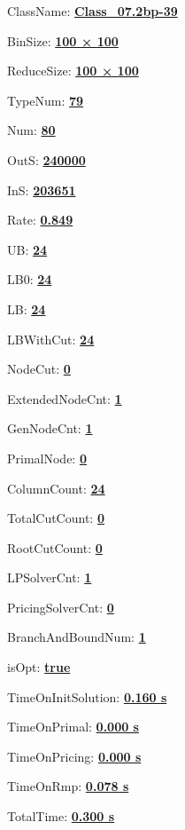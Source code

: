 \documentclass[11pt]{article}
\begin{document}
\pagestyle{empty}


ClassName: \underline{\textbf{Class_07.2bp-39}}
\par
BinSize: \underline{\textbf{100 × 100}}
\par
ReduceSize: \underline{\textbf{100 × 100}}
\par
TypeNum: \underline{\textbf{79}}
\par
Num: \underline{\textbf{80}}
\par
OutS: \underline{\textbf{240000}}
\par
InS: \underline{\textbf{203651}}
\par
Rate: \underline{\textbf{0.849}}
\par
UB: \underline{\textbf{24}}
\par
LB0: \underline{\textbf{24}}
\par
LB: \underline{\textbf{24}}
\par
LBWithCut: \underline{\textbf{24}}
\par
NodeCut: \underline{\textbf{0}}
\par
ExtendedNodeCnt: \underline{\textbf{1}}
\par
GenNodeCnt: \underline{\textbf{1}}
\par
PrimalNode: \underline{\textbf{0}}
\par
ColumnCount: \underline{\textbf{24}}
\par
TotalCutCount: \underline{\textbf{0}}
\par
RootCutCount: \underline{\textbf{0}}
\par
LPSolverCnt: \underline{\textbf{1}}
\par
PricingSolverCnt: \underline{\textbf{0}}
\par
BranchAndBoundNum: \underline{\textbf{1}}
\par
isOpt: \underline{\textbf{true}}
\par
TimeOnInitSolution: \underline{\textbf{0.160 s}}
\par
TimeOnPrimal: \underline{\textbf{0.000 s}}
\par
TimeOnPricing: \underline{\textbf{0.000 s}}
\par
TimeOnRmp: \underline{\textbf{0.078 s}}
\par
TotalTime: \underline{\textbf{0.300 s}}
\par
\newpage


\end{document}
